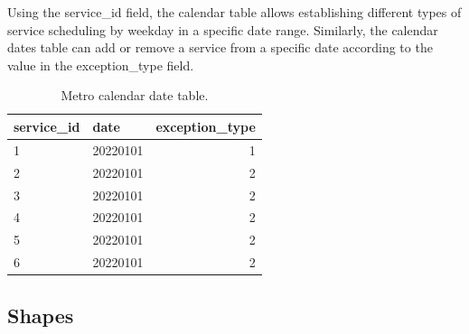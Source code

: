 \documentclass[12pt, a4paper]{report}
\begin{document}
\begin{table}[ht]
\centering
{}
\caption{Metro calendar table.}
\label{tab:Metro_Calendar}
\end{table}

Using the service\_id field, the calendar table allows establishing different types of service scheduling by weekday in a specific date range. Similarly, the calendar dates table can add or remove a service from a specific date according to the value in the exception\_type field.

\begin{table}[ht]
\centering
\begin{tabular}{llr}
  \hline
 service\_id & date & exception\_type \\ 
  \hline
1 & 20220101 &   1 \\ 
2 & 20220101 &   2 \\ 
3 & 20220101 &   2 \\ 
4 & 20220101 &   2 \\ 
5 & 20220101 &   2 \\ 
6 & 20220101 &   2 \\ 
   \hline
\end{tabular}%
\caption{Metro calendar date table.}
\label{tab:Metro_Calendar_Dates}
\end{table}

\subsection{Shapes}
\end{document}
